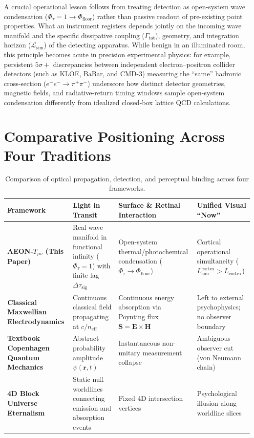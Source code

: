 \documentclass[11pt,a4paper]{article}
\begin{document}
\begin{tcolorbox}[colback=blue!4,colframe=blue!40,title=\textbf{Methodological Footnote: Apparatus-Dependent Open-System Condensation}]
\small
A crucial operational lesson follows from treating detection as open-system wave condensation ($\Phi_\tau = 1 \to \Phi_{\mathrm{floor}}$) rather than passive readout of pre-existing point properties. What an instrument registers depends jointly on the incoming wave manifold and the specific dissipative coupling ($\Gamma_{\mathrm{tot}}$), geometry, and integration horizon ($\mathcal{L}_{\mathrm{sim}}$) of the detecting apparatus. While benign in an illuminated room, this principle becomes acute in precision experimental physics: for example, persistent $5\sigma+$ discrepancies between independent electron--positron collider detectors (such as KLOE, BaBar, and CMD-3) measuring the ``same'' hadronic cross-section ($e^+e^- \to \pi^+\pi^-$) underscore how distinct detector geometries, magnetic fields, and radiative-return timing windows sample open-system condensation differently from idealized closed-box lattice QCD calculations.
\end{tcolorbox}

\section{Comparative Positioning Across Four Traditions}

\begin{table}[h!]
\centering
\scriptsize
\begin{tabularx}{\textwidth}{>{\bfseries}p{2.5cm} X X X}
\toprule
Framework & Light in Transit & Surface \& Retinal Interaction & Unified Visual ``Now'' \\
\midrule
AEON-$T_{\mu\nu}$ (This Paper) & Real wave manifold in functional infinity ($\Phi_\tau = 1$) with finite lag $\Delta\tau_{\mathrm{sig}}$ & Open-system thermal/photochemical condensation ($\Phi_\tau \to \Phi_{\mathrm{floor}}$) & Cortical operational simultaneity ($L_{\mathrm{sim}}^{\mathrm{cortex}} > L_{\mathrm{cortex}}$) \\
\addlinespace
Classical Maxwellian Electrodynamics & Continuous classical field propagating at $c / n_{\mathrm{eff}}$ & Continuous energy absorption via Poynting flux $\mathbf{S} = \mathbf{E} \times \mathbf{H}$ & Left to external psychophysics; no observer boundary \\
\addlinespace
Textbook Copenhagen Quantum Mechanics & Abstract probability amplitude $\psi(\mathbf{r},t)$ & Instantaneous non-unitary measurement collapse & Ambiguous observer cut (von Neumann chain) \\
\addlinespace
4D Block Universe Eternalism & Static null worldlines connecting emission and absorption events & Fixed 4D intersection vertices & Psychological illusion along worldline slices \\
\bottomrule
\end{tabularx}
\caption{Comparison of optical propagation, detection, and perceptual binding across four frameworks.}
\end{table}
\end{document}
